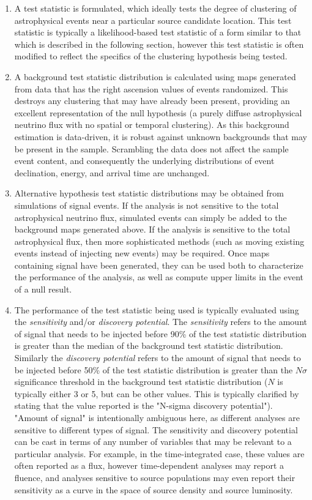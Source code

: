 \begin{enumerate}
    \item A test statistic is formulated, which ideally tests the degree of clustering of astrophysical events near a particular source candidate location. This test statistic is typically a likelihood-based test statistic of a form similar to that which is described in the following section, however this test statistic is often modified to reflect the specifics of the clustering hypothesis being tested. 
    \item A background test statistic distribution is calculated using maps generated from data that has the right ascension values of events randomized. This destroys any clustering that may have already been present, providing an excellent representation of the null hypothesis (a purely diffuse astrophysical neutrino flux with no spatial or temporal clustering). As this background estimation is data-driven, it is robust against unknown backgrounds that may be present in the sample. Scrambling the data does not affect the sample event content, and consequently the underlying distributions of event declination, energy, and arrival time are unchanged. 
    \item Alternative hypothesis test statistic distributions may be obtained from simulations of signal events. If the analysis is not sensitive to the total astrophysical neutrino flux, simulated events can simply be added to the background maps generated above. If the analysis is sensitive to the total astrophysical flux, then more sophisticated methods (such as moving existing events instead of injecting new events) may be required. Once maps containing signal have been generated, they can be used both to characterize the performance of the analysis, as well as compute upper limits in the event of a null result.
    \item The performance of the test statistic being used is typically evaluated using the \textit{sensitivity} and/or \textit{discovery potential}. The \textit{sensitivity} refers to the amount of signal that needs to be injected before 90\% of the test statistic distribution is greater than the median of the background test statistic distribution. Similarly the \textit{discovery potential} refers to the amount of signal that needs to be injected before 50\% of the test statistic distribution is greater than the $N\sigma$ significance threshold in the background test statistic distribution ($N$ is typically either 3 or 5, but can be other values. This is typically clarified by stating that the value reported is the "N-sigma discovery potential"). "Amount of signal" is intentionally ambiguous here, as different analyses are sensitive to different types of signal. The sensitivity and discovery potential can be cast in terms of any number of variables that may be relevant to a particular analysis. For example, in the time-integrated case, these values are often reported as a flux, however time-dependent analyses may report a fluence, and analyses sensitive to source populations may even report their sensitivity as a curve in the space of source density and source luminosity. 

\end{enumerate}
